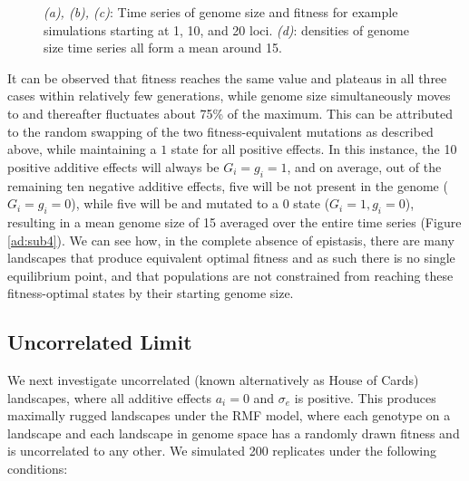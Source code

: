 \documentclass[paper=a4, fontsize=11pt,twoside]{scrartcl}       %
\begin{document}
\begin{figure}[h!]
	\caption{\textit{(a), (b), (c)}: Time series of genome size and fitness for example simulations starting at 1, 10, and 20 loci. \textit{(d)}: densities of genome size time series all form a mean around 15.}
	\label{additivedynamics}
\end{figure}

It can be observed that fitness reaches the same value and plateaus in all three cases within relatively few generations, while genome size simultaneously moves to and thereafter fluctuates about 75\% of the maximum. This can be attributed to the random swapping of the two fitness-equivalent mutations as described above, while maintaining a $1$ state for all positive effects. In this instance, the 10 positive additive effects will always be $G_i = g_i = 1$, and on average, out of the remaining ten negative additive effects, five will be not present in the genome ($G_i = g_i = 0$), while five will be and mutated to a $0$ state ($G_i = 1, g_i = 0$), resulting in a mean genome size of 15 averaged over the entire time series (Figure \ref{ad:sub4}). We can see how, in the complete absence of epistasis, there are many landscapes that produce equivalent optimal fitness and as such there is no single equilibrium point, and that populations are not constrained from reaching these fitness-optimal states by their starting genome size. 

\subsection*{Uncorrelated Limit}

We next investigate uncorrelated (known alternatively as House of Cards) landscapes, where all additive effects $a_i = 0$ and $\sigma_e$ is positive. This produces maximally rugged landscapes under the RMF model, where each genotype on a landscape and each landscape in genome space has a randomly drawn fitness and is uncorrelated to any other. We simulated 200 replicates under the following conditions:
\end{document}
